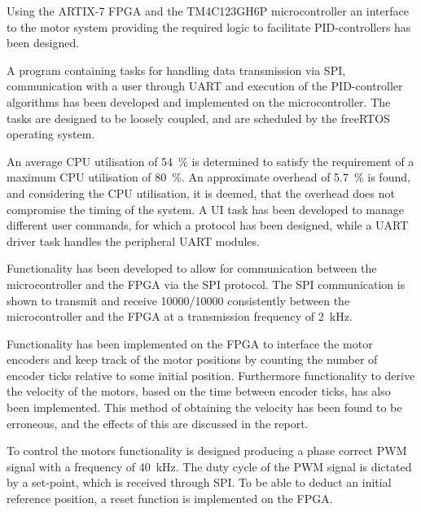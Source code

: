 \documentclass[../../main.tex]{subfiles}
\begin{document}

Using the ARTIX-7 FPGA and the TM4C123GH6P microcontroller an interface to the motor system providing the required logic to facilitate PID-controllers has been designed. 

A program containing tasks for handling data transmission via SPI, communication with a user through UART and execution of the PID-controller algorithms has been developed and implemented on the microcontroller. The tasks are designed to be loosely coupled, and are scheduled by the freeRTOS operating system.

An average CPU utilisation of \SI{54}{\percent} is determined to satisfy the requirement of a maximum CPU utilisation of \SI{80}{\percent}. An approximate overhead of \SI{5,7}{\percent} is found, and considering the CPU utilisation, it is deemed, that the overhead does not compromise the timing of the system. A UI task has been developed to manage different user commands, for which a protocol has been designed, while a UART driver task handles the peripheral UART modules.

Functionality has been developed to allow for communication between the microcontroller and the FPGA via the SPI protocol. The SPI communication is shown to transmit and receive 10000/10000 consistently between the microcontroller and the FPGA at a transmission frequency of \SI{2}{\kilo\hertz}. 

Functionality has been implemented on the FPGA to interface the motor encoders and keep track of the motor positions by counting the number of encoder ticks relative to some initial position. Furthermore functionality to derive the velocity of the motors, based on the time between encoder ticks, has also been implemented. This method of obtaining the velocity has been found to be erroneous, and the effects of this are discussed in the report. 

To control the motors functionality is designed producing a phase correct PWM signal with a frequency of \SI{40}{\kilo\hertz}. The duty cycle of the PWM signal is dictated by a set-point, which is received through SPI. To be able to deduct an initial reference position, a reset function is implemented on the FPGA.
\end{document}
